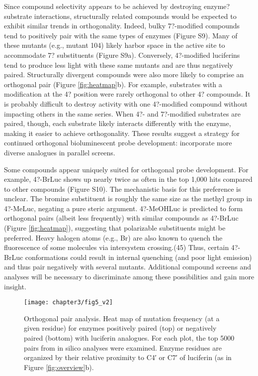 \par
Since compound selectivity appears to be achieved by destroying enzyme?substrate interactions, structurally related compounds would be expected to exhibit similar trends in orthogonality. Indeed, bulky 7?-modified compounds tend to positively pair with the same types of enzymes (Figure S9). Many of these mutants (e.g., mutant 104) likely harbor space in the active site to accommodate 7? substituents (Figure S9a).
Conversely, 4?-modified luciferins tend to produce less light with these same mutants and are thus negatively paired. Structurally divergent compounds were also more likely to comprise an orthogonal pair (Figure \ref{fig:heatmap}b). For example, substrates with a modification at the 4? position were rarely orthogonal to other 4? compounds. It is probably difficult to destroy activity with one 4?-modified compound without impacting others in the same series. When 4?- and 7?-modified substrates are paired, though, each substrate likely interacts differently with the enzyme, making it easier to achieve orthogonality. These results suggest a strategy for continued orthogonal bioluminescent probe development: incorporate more diverse analogues in parallel screens.
\par
Some compounds appear uniquely suited for orthogonal probe development. For example, 4?-BrLuc shows up nearly twice as often in the top 1,000 hits compared to other compounds (Figure S10). The mechanistic basis for this preference is unclear. The bromine substituent is roughly the same size as the methyl group in 4?-MeLuc, negating a pure steric argument. 4?-MeOHLuc is predicted to form orthogonal pairs (albeit less frequently) with similar compounds as 4?-BrLuc (Figure \ref{fig:heatmap}), suggesting that polarizable substituents might be preferred. Heavy halogen atoms (e.g., Br) are also known to quench the fluorescence of some molecules via intersystem crossing.\cite{Solovyov:2005by}(45) Thus, certain 4?-BrLuc conformations could result in internal quenching (and poor light emission) and thus pair negatively with several mutants. Additional compound screens and analyses will be necessary to discriminate among these possibilities and gain more insight.
\par
\begin{figure}[htbp]
\texttt{[image: chapter3/fig5\_v2]}
\centering
\caption[Orthogonal pair analysis]{Orthogonal pair analysis. Heat map of mutation frequency (at a given residue) for enzymes positively paired (top) or negatively paired (bottom) with luciferin analogues. For each plot, the top 5000 pairs from in silico analyses were examined. Enzyme residues are organized by their relative proximity to C4′ or C7′ of luciferin (as in Figure \ref{fig:overview}b).}
  \label{fig:willsHeatmap}
\end{figure}
